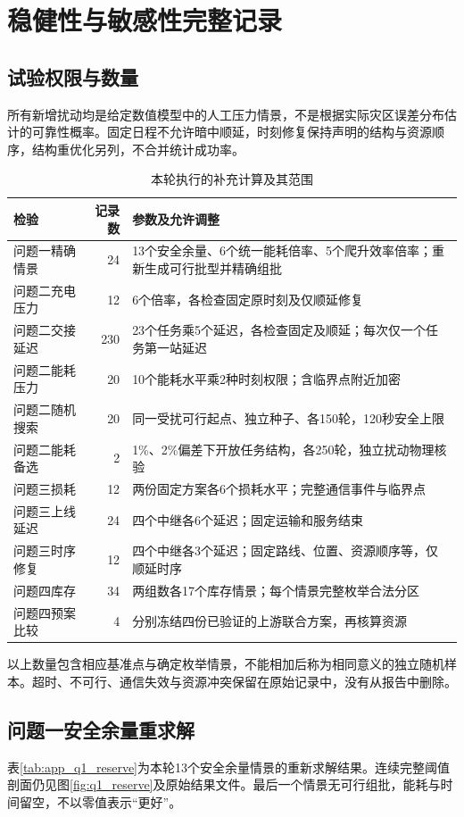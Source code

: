 \documentclass[withoutpreface,colorprint]{format}
\numberwithin{equation}{section}
\numberwithin{figure}{section}
\numberwithin{table}{section}
\begin{document}
\section{稳健性与敏感性完整记录}
\label{app:experiments}
\subsection{试验权限与数量}
所有新增扰动均是给定数值模型中的人工压力情景，不是根据实际灾区误差分布估计的可靠性概率。固定日程不允许暗中顺延，时刻修复保持声明的结构与资源顺序，结构重优化另列，不合并统计成功率。
\begin{table}[htbp]\centering\small
\caption{本轮执行的补充计算及其范围}\label{tab:app_experiment_scope}
\begin{tabular}{@{}p{2.3cm}rp{8.9cm}@{}}\toprule
检验 & 记录数 & 参数及允许调整\\\midrule
问题一精确情景 & 24 & 13个安全余量、6个统一能耗倍率、5个爬升效率倍率；重新生成可行批型并精确组批\\
问题二充电压力 & 12 & 6个倍率，各检查固定原时刻及仅顺延修复\\
问题二交接延迟 & 230 & 23个任务乘5个延迟，各检查固定及顺延；每次仅一个任务第一站延迟\\
问题二能耗压力 & 20 & 10个能耗水平乘2种时刻权限；含临界点附近加密\\
问题二随机搜索 & 20 & 同一受扰可行起点、独立种子、各150轮，120秒安全上限\\
问题二能耗备选 & 2 & 1\%、2\%偏差下开放任务结构，各250轮，独立扰动物理核验\\
问题三损耗 & 12 & 两份固定方案各6个损耗水平；完整通信事件与临界点\\
问题三上线延迟 & 24 & 四个中继各6个延迟；固定运输和服务结束\\
问题三时序修复 & 12 & 四个中继各3个延迟；固定路线、位置、资源顺序等，仅顺延时序\\
问题四库存 & 34 & 两组数各17个库存情景；每个情景完整枚举合法分区\\
问题四预案比较 & 4 & 分别冻结四份已验证的上游联合方案，再核算资源\\\bottomrule
\end{tabular}
\end{table}
以上数量包含相应基准点与确定枚举情景，不能相加后称为相同意义的独立随机样本。超时、不可行、通信失效与资源冲突保留在原始记录中，没有从报告中删除。

\subsection{问题一安全余量重求解}
表\ref{tab:app_q1_reserve}为本轮13个安全余量情景的重新求解结果。连续完整阈值剖面仍见图\ref{fig:q1_reserve}及原始结果文件。最后一个情景无可行组批，能耗与时间留空，不以零值表示“更好”。
\end{document}
